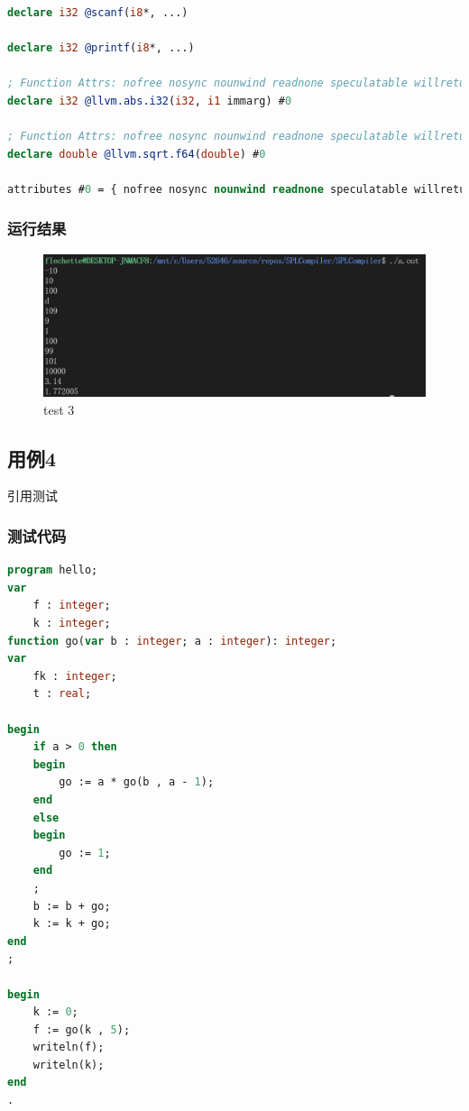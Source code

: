 \documentclass{article}
\begin{document}
\begin{lstlisting}[language=LLVM]
declare i32 @scanf(i8*, ...)

declare i32 @printf(i8*, ...)

; Function Attrs: nofree nosync nounwind readnone speculatable willreturn
declare i32 @llvm.abs.i32(i32, i1 immarg) #0

; Function Attrs: nofree nosync nounwind readnone speculatable willreturn
declare double @llvm.sqrt.f64(double) #0

attributes #0 = { nofree nosync nounwind readnone speculatable willreturn }
\end{lstlisting}

\subsubsection{运行结果}
\begin{figure}[H]
    \centering
    \includegraphics[width=1\textwidth]{test3res.png}
    \caption{test 3}
\end{figure}



\subsection{用例4}
\par 引用测试
\subsubsection{测试代码}
\begin{lstlisting}[language=pascal,showstringspaces=false]
program hello;
var	
	f : integer;
	k : integer;
function go(var b : integer; a : integer): integer;
var 
	fk : integer;
	t : real;

begin
	if a > 0 then 
	begin
		go := a * go(b , a - 1);
	end
	else
	begin
		go := 1;
	end
	;
	b := b + go;
	k := k + go;
end
;

begin
	k := 0;
	f := go(k , 5);
	writeln(f);
	writeln(k);
end
.
\end{lstlisting}
\end{document}
